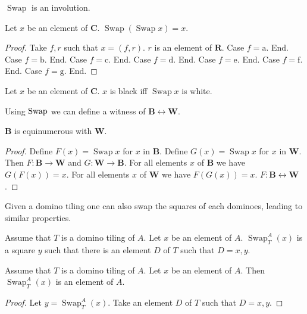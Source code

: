 \documentclass{article}
\newcommand{\Rank}{\mathbf{R}} %
\newcommand{\fileA}{\mathrm{a}}
\newcommand{\fileB}{\mathrm{b}}
\newcommand{\fileC}{\mathrm{c}}
\newcommand{\fileD}{\mathrm{d}}
\newcommand{\fileE}{\mathrm{e}}
\newcommand{\fileF}{\mathrm{f}}
\newcommand{\fileG}{\mathrm{g}}
\newcommand{\Checkerboard}{\mathbf{C}}
\newcommand{\Black}{\mathbf{B}}
\newcommand{\White}{\mathbf{W}}
\newcommand{\Swap}[1]{\operatorname{Swap}#1}
\newcommand{\Sw}[3]{\operatorname{Swap}_{#1}^{#2}(#3)}
\begin{document}
$\Swap{}$ is an involution.

\begin{forthel}
    \begin{lemma}
        Let $x$ be an element of $\Checkerboard$.
        $\Swap{(\Swap{x})} = x$.
    \end{lemma}
    \begin{proof}
        Take $f, r$ such that $x = (f,r)$. $r$ is an element of $\Rank$.
        Case $f = \fileA$. End.
        Case $f = \fileB$. End.
        Case $f = \fileC$. End.
        Case $f = \fileD$. End.
        Case $f = \fileE$. End.
        Case $f = \fileF$. End.
        Case $f = \fileG$. End.
    \end{proof}

    \begin{lemma}
        Let $x$ be an element of $\Checkerboard$.
        $x$ is black iff $\Swap{x}$ is white.
    \end{lemma}
\end{forthel}

Using $\Swap$ we can define a witness of $\Black \leftrightarrow \White$.

\begin{forthel}
    \begin{lemma}
        $\Black$ is equinumerous with $\White$.
    \end{lemma}
    \begin{proof}
        Define $F(x) = \Swap{x}$ for $x$ in $\Black$.
        Define $G(x) = \Swap{x}$ for $x$ in $\White$.
        Then $F : \Black \to \White$ and $G : \White \to \Black$.
        For all elements $x$ of $\Black$ we have $G(F(x)) = x$.
        For all elements $x$ of $\White$ we have $F(G(x)) = x$.
        $F : \Black \leftrightarrow \White$.
    \end{proof}
\end{forthel}

Given a domino tiling one can also swap the squares of each dominoes,
leading to similar properties.

\begin{forthel}
    \begin{signature}
        Assume that $T$ is a domino tiling of $A$.
        Let $x$ be an element of $A$.
        $\Sw{T}{A}{x}$ is a square $y$ such that there is an element $D$ of $T$
        such that $D = {x,y}$.
    \end{signature}

    \begin{lemma}
        Assume that $T$ is a domino tiling of $A$.
        Let $x$ be an element of $A$.
        Then $\Sw{T}{A}{x}$ is an element of $A$.
    \end{lemma}
    \begin{proof}
        Let $y = \Sw{T}{A}{x}$.
        Take an element $D$ of $T$ such that $D = {x,y}$.
    \end{proof}
\end{forthel}
\end{document}
